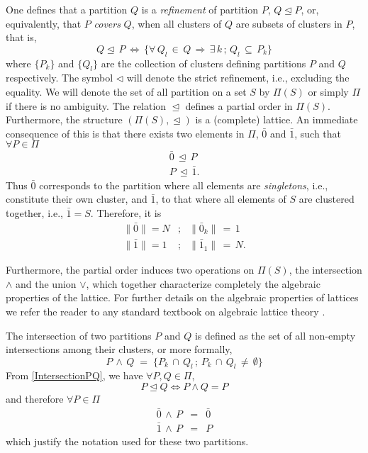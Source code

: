 \documentclass[twocolumn,aps,sort,nofootinbib]{revtex4}
\begin{document}
One defines that a partition $Q$ is
a {\sl refinement } of partition $P$, $Q\trianglelefteq P$, 
or, equivalently, that $P$ {\sl covers} $Q$,
when all clusters of $Q$ are subsets of 
clusters in $P$, that is,
\begin{equation}
Q\trianglelefteq\,P\,\Leftrightarrow\,\{\forall\,Q_l\,\in\,Q\,\Rightarrow\,\exists\,k\,;\,Q_l\,\subseteq\,P_k\}
\end{equation}
where $\{P_k\}$ and $\{Q_l\}$ are the collection of clusters defining partitions $P$ and $Q$ respectively.
The symbol $\triangleleft$ will denote the strict refinement, i.e., excluding the equality.
We will denote the set of all partition on a set $S$ by $\Pi(S)$ or simply $\Pi$ if there is no ambiguity.
The relation $\trianglelefteq$ defines a partial order in $\Pi(S)$. Furthermore, the 
structure $\left(\Pi(S),\trianglelefteq\right)$ is a (complete) lattice.
An immediate consequence of this is that there exists two elements in $\Pi$, ${\bar 0}$ and ${\bar 1}$, such
that $\forall P \in \Pi$
\begin{eqnarray*}
{\bar 0}\,\trianglelefteq\,P \\
P\,\trianglelefteq\,{\bar 1}.
\end{eqnarray*}
Thus ${\bar 0}$ corresponds to the partition where all elements are {\sl singletons}, i.e.,
constitute their own cluster, and ${\bar 1}$, to that where all elements of $S$ are clustered together,
i.e., ${\bar 1}=S$. Therefore, it is 
\begin{eqnarray*}
\|{\bar 0}\|= N & ; & \|{\bar 0}_k\|\,=\,1 \\
\|{\bar 1}\|= 1 & ; & \|{\bar 1}_1\|\,=\,N . 
\end{eqnarray*}

Furthermore, the partial order induces two operations on $\Pi(S)$, the 
intersection $\wedge$ and the union $\vee$, which together characterize completely the algebraic properties
of the lattice.  
For further details on the algebraic properties of lattices
we refer the reader to any standard textbook on algebraic lattice theory \cite{Burris81,Davey02}.

The intersection of two partitions $P$ and $Q$ is defined as the set of all non-empty 
intersections among their
clusters, or more formally, 
\begin{equation}
P\,\wedge\,Q\;=\;\{ P_k\,\cap\,Q_l\,;\,P_k\,\cap\,Q_l \,\neq\,\emptyset \}
\label{IntersectionPQ}
\end{equation}
From \ref{IntersectionPQ}, we have $\forall P,Q \in \Pi$,
\begin{equation}
P\trianglelefteq Q \Leftrightarrow P\wedge Q = P
\label{OrderIntersection}
\end{equation}
and therefore $\forall P \in \Pi$
\begin{eqnarray*}
{\bar 0}\,\wedge\,P &=&{\bar 0}\\
{\bar 1}\,\wedge\,P &=&P
\end{eqnarray*}
which justify the notation used for these two partitions.
\end{document}
